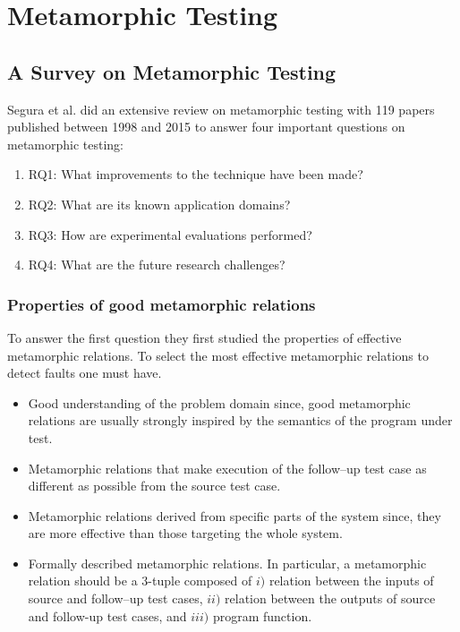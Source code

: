 \section{Metamorphic Testing}
	\subsection{A Survey on Metamorphic Testing}
		Segura et al. did an extensive review on metamorphic testing with 119 papers published between 1998 and 2015 to answer four important questions on metamorphic testing:
		\begin{enumerate}
			\item RQ1: What improvements to the technique have been made?
			\item RQ2: What are its known application domains?
			\item RQ3: How are experimental evaluations performed?
			\item RQ4: What are the future research challenges?
		\end{enumerate}
		\subsubsection{Properties of good metamorphic relations}
			To answer the first question they first studied the properties of effective metamorphic relations. To select the most effective metamorphic relations to detect faults one must have.
			\begin{itemize}
				\item Good understanding of the problem domain since, good metamorphic relations are usually strongly inspired by the semantics of the program under test.
				\item Metamorphic relations that make execution of the follow–up test case as different as possible from the source test case.
				\item Metamorphic relations derived from specific parts of the system since, they are more effective than those targeting the whole system.
				\item Formally described metamorphic relations. In particular, a metamorphic relation should be a 3-tuple composed of $i)$ relation between the inputs of source and follow–up test cases, $ii)$ relation between the outputs of source and follow-up test cases, and $iii)$ program function.
			\end{itemize}
